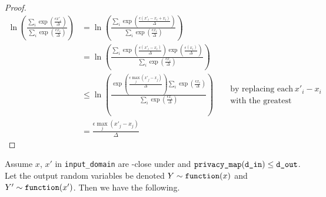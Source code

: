 \documentclass{article}
\begin{document}
\begin{proof} 
\begin{align*} 
    \ln\left(\frac{\sum_{i} \exp(\frac{\epsilon x'_i}{\Delta})}{\sum_{i} \exp(\frac{\epsilon x_i}{\Delta})}\right) 
    &= \ln\left(\frac{\sum_{i} \exp(\frac{\epsilon (x'_i - x_i + x_i)}{\Delta})}{\sum_{i} \exp(\frac{\epsilon x_i}{\Delta})}\right) \\ 
    &= \ln\left(\frac{\sum_{i} \exp(\frac{\epsilon (x'_i - x_i)}{\Delta})\exp(\frac{\epsilon (x_i)}{\Delta})}{\sum_{i} \exp(\frac{\epsilon x_i}{\Delta})}\right) \\ 
    &\le \ln\left(\frac{\exp(\frac{\epsilon \max_j(x'_j - x_j)}{\Delta}) \sum_{i} \exp(\frac{\epsilon x_i}{\Delta})}{\sum_{i} \exp(\frac{\epsilon x_i}{\Delta})}\right) 
        &&\begin{split}\text{by replacing each } x'_i-x_i \\ \text{with the greatest difference}\end{split}\\ 
    &= \frac{\epsilon \max_j(x'_j - x_j)}{\Delta} 
\end{align*} 
\end{proof} 
 
\label{privacy-guarantee} 
Assume $x$, $x'$ in \texttt{input\_domain} are \din-close under  and $\texttt{privacy\_map}(\texttt{d\_in}) \le \texttt{d\_out}$. 
Let the output random variables be denoted $Y \sim \texttt{function}(x)$ and $Y' \sim \texttt{function}(x')$.
Then we have the following.
 
\end{document}
